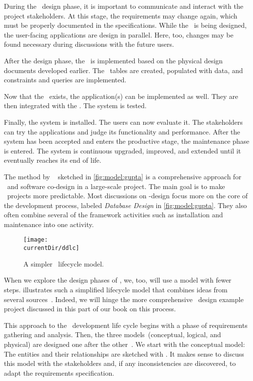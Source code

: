 During the \db\ design phase, it is important to communicate and interact with the project stakeholders.
At this stage, the requirements may change again, which must be properly documented in the specifications.
While the \db\ is being designed, the user-facing applications are design in parallel.
Here, too, changes may be found necessary during discussions with the future users.

After the design phase, the \db\ is implemented based on the physical design documents developed earlier.
The \db\ tables are created, populated with data, and constraints and queries are implemented.

Now that the \db\ exists, the application(s) can be implemented as well.
They are then integrated with the \db.
The system is tested.

Finally, the system is installed.
The users can now evaluate it.
The stakeholders can try the applications and judge its functionality and performance.
After the system has been accepted and enters the productive stage, the maintenance phase is entered.
The system is continuous upgraded, improved, and extended until it eventually reaches its end of life.

The method by \citeauthor{GMTM2011DDLC}~\cite{GMTM2011DDLC} sketched in \cref{fig:model:gupta} is a comprehensive approach for \db\ and software co-design in a large-scale project.
The main goal is to make \db\ projects more predictable.
Most discussions on -design focus more on the core of the development process, labeled \emph{Database Design} in \cref{fig:model:gupta}.
They also often combine several of the framework activities such as installation and maintenance into one activity.

\begin{figure}%
\centering%
\texttt{[image: \\currentDir/ddlc]}%
\caption{A simpler \db\ lifecycle model.}%
\label{fig:model:ddlc}%
\end{figure}%

When we explore the design phases of , we, too, will use a model with fewer steps.
 illustrates such a simplified lifecycle model that combines ideas from several sources~\cite{SS2005EIDDDFDB:I,SS2005EIDDDFDB:CDDRAAML,D2022DN:DRA}.
Indeed, we will hinge the more comprehensive \db\ design example project discussed in this part of our book on this process.

This approach to the \db\ development life cycle begins with a phase of requirements gathering and analysis.
Then, the three models~(conceptual, logical, and physical) are designed one after the other~\cite{EN2015FODS}.
We start with the conceptual model:
The entities and their relationships are sketched with .
It makes sense to discuss this model with the stakeholders and, if any inconsistencies are discovered, to adapt the requirements specification.

